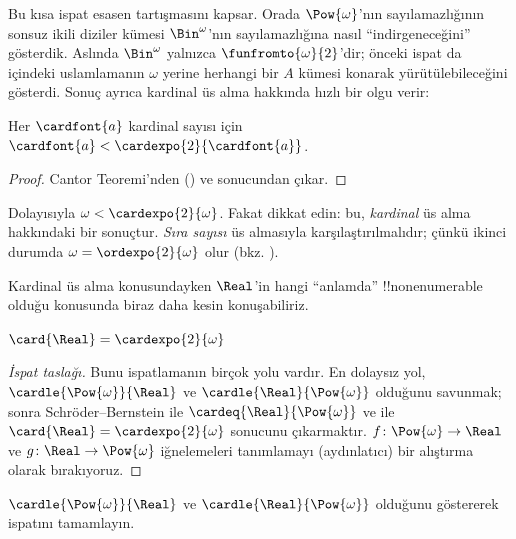 \documentclass[../../../include/open-logic-section]{subfiles}
\begin{document}
Bu kısa ispat esasen  tartışmasını kapsar.
Orada $\Pow{\omega}$'nın sayılamazlığının sonsuz ikili diziler kümesi
$\Bin^\omega$'nın sayılamazlığına nasıl ``indirgeneceğini'' gösterdik.
Aslında $\Bin^\omega$ yalnızca $\funfromto{\omega}{2}$'dir; önceki ispat
da  içindeki uslamlamanın $\omega$ yerine
herhangi bir $A$ kümesi konarak yürütülebileceğini gösterdi. Sonuç ayrıca
kardinal üs alma hakkında hızlı bir olgu verir:

\begin{cor}
Her $\cardfont{a}$ kardinal sayısı için
$\cardfont{a}<\cardexpo{2}{\cardfont{a}}$.
\end{cor}

\begin{proof}
Cantor Teoremi'nden () ve
 sonucundan çıkar.
\end{proof}
\noindent
Dolayısıyla $\omega<\cardexpo{2}{\omega}$. Fakat dikkat edin: bu,
\emph{kardinal} üs alma hakkındaki bir sonuçtur. \emph{Sıra sayısı} üs
almasıyla karşılaştırılmalıdır; çünkü ikinci durumda
$\omega=\ordexpo{2}{\omega}$ olur (bkz.
).

Kardinal üs alma konusundayken $\Real$'in hangi ``anlamda''
!!{nonenumerable} olduğu konusunda biraz daha kesin konuşabiliriz.

\begin{thm}
$\card{\Real} = \cardexpo{2}{\omega}$
\end{thm}

\begin{proof}[İspat taslağı]
Bunu ispatlamanın birçok yolu vardır. En dolaysız yol,
$\cardle{\Pow{\omega}}{\Real}$ ve $\cardle{\Real}{\Pow{\omega}}$
olduğunu savunmak; sonra Schröder--Bernstein ile
$\cardeq{\Real}{\Pow{\omega}}$ ve
 ile
$\card{\Real}=\cardexpo{2}{\omega}$ sonucunu çıkarmaktır.
$f\colon\Pow{\omega}\to\Real$ ve $g\colon\Real\to\Pow{\omega}$
iğnelemeleri tanımlamayı (aydınlatıcı) bir alıştırma olarak bırakıyoruz.
\end{proof}

\begin{prob}
$\cardle{\Pow{\omega}}{\Real}$ ve $\cardle{\Real}{\Pow{\omega}}$
olduğunu göstererek
 ispatını
tamamlayın.
\end{prob}
\end{document}
